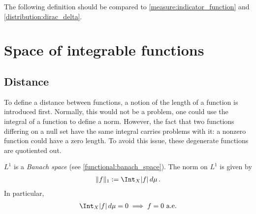     The following definition should be compared to \cref{measure:indicator_function} and \cref{distribution:dirac_delta}.

\section{Space of integrable functions}
\subsection{Distance}

    To define a distance between functions, a notion of the length of a function is introduced first. Normally, this would not be a problem, one could use the integral of a function to define a norm. However, the fact that two functions differing on a null set have the same integral carries problems with it: a nonzero function could have a zero length. To avoid this issue, these degenerate functions are quotiented out.

    \begin{property}
        $L^1$ is a \textit{Banach space} (see \cref{functional:banach_space}). The norm on $L^1$ is given by
        \begin{gather}
            \label{measure:L1_norm}
            \|f\|_1 := \Int_X|f|\,d\mu\,.
        \end{gather}
        In particular,
        \begin{gather}
            \Int_X|f|\,d\mu=0\implies f=0\text{ a.e.}
        \end{gather}
    \end{property}

